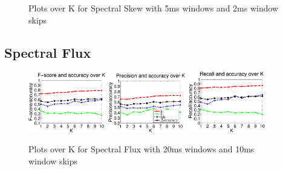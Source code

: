 {{{\begin{figure}
				\caption{Plots over K for Spectral Skew with 5ms windows and 2ms window skips}
		\end{figure}\clearpage
		
	
	\subsection{Spectral Flux}
		
		\begin{figure}
		
		
			\centering\includegraphics[width=0.3\textwidth]{tex/appendices/test/sflux2010FP.png}
			\centering\includegraphics[width=0.3\textwidth]{tex/appendices/test/sflux2010_P.png}
			\centering\includegraphics[width=0.3\textwidth]{tex/appendices/test/sflux2010_R.png}
			
			\caption{Plots over K for Spectral Flux with 20ms windows and 10ms window skips}
		\end{figure}
		\begin{figure}
		

\end{figure}}}}
